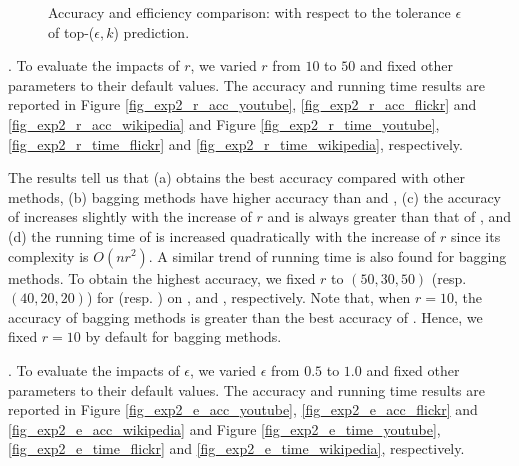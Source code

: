 {\begin{figure}[tb!]
  \quad\quad
  \vspace{-2ex}
  \caption{Accuracy and efficiency comparison: with respect to the tolerance $\epsilon$
  of top-($\epsilon, k$) prediction. }\label{fig_exp2_e}
  \vspace{-3ex}
\end{figure}
} %


. To evaluate the impacts of $r$, we
varied $r$ from $10$ to $50$ and fixed other parameters to their
default values. The accuracy and running time results are reported in
Figure \ref{fig_exp2_r_acc_youtube}, \ref{fig_exp2_r_acc_flickr} and
\ref{fig_exp2_r_acc_wikipedia} and Figure \ref{fig_exp2_r_time_youtube},
\ref{fig_exp2_r_time_flickr} and \ref{fig_exp2_r_time_wikipedia}, respectively.



The results tell us that (a) \Biased obtains the best accuracy compared with other
methods, (b) bagging methods have higher accuracy than \NMF and \BIGCLAM,
(c) the accuracy of \NMF increases slightly with the increase of $r$ and is always
greater than that of \BIGCLAM, and (d) the running time of \NMF is increased
quadratically with the increase of $r$ since its complexity is $O(nr^2)$.
A similar trend of running time is also found for bagging methods. To obtain the
highest accuracy, we fixed $r$ to $(50, 30, 50)$ (resp. $(40, 20, 20)$) for \NMF
(resp. \BIGCLAM) on \YouTube, \Flickr and \Wikipedia, respectively. Note that, when $r = 10$,
the accuracy of bagging methods is greater than the best accuracy of \NMF. Hence, we
fixed $r = 10$ by default for bagging methods.




. To evaluate the impacts of $\epsilon$, we
varied $\epsilon$ from $0.5$ to $1.0$ and fixed other parameters to their
default values. The accuracy and running time results are reported in
Figure \ref{fig_exp2_e_acc_youtube}, \ref{fig_exp2_e_acc_flickr} and
\ref{fig_exp2_e_acc_wikipedia} and Figure \ref{fig_exp2_e_time_youtube},
\ref{fig_exp2_e_time_flickr} and \ref{fig_exp2_e_time_wikipedia}, respectively.



